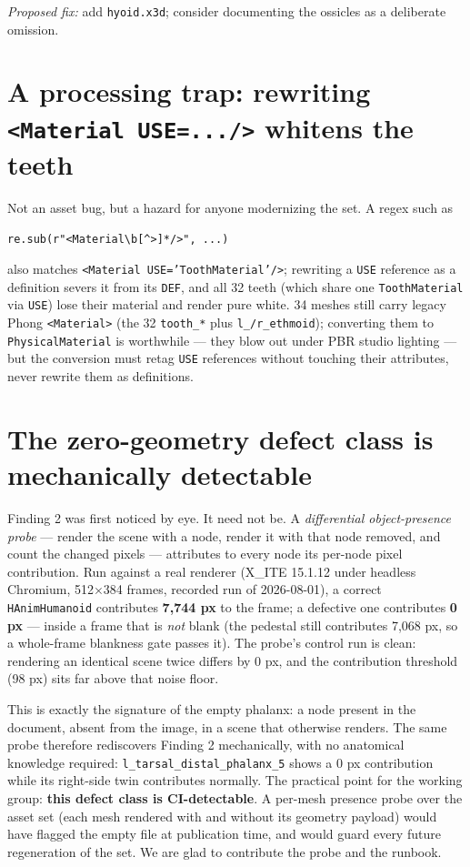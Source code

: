 \documentclass[10pt]{article}
\newcommand{\code}[1]{\texttt{#1}}
\begin{document}
\emph{Proposed fix:} add \code{hyoid.x3d}; consider documenting the ossicles as a
deliberate omission.

\section{A processing trap: rewriting \code{<Material USE=.../>} whitens the teeth}
Not an asset bug, but a hazard for anyone modernizing the set. A regex such as
\begin{center}
\code{re.sub(r"<Material\textbackslash b[\textasciicircum>]*/>", ...)}
\end{center}
also matches
\code{<Material USE='ToothMaterial'/>}; rewriting a \code{USE} reference as a definition
severs it from its \code{DEF}, and all 32 teeth (which share one \code{ToothMaterial} via
\code{USE}) lose their material and render pure white. 34 meshes still carry legacy Phong
\code{<Material>} (the 32 \code{tooth\_*} plus \code{l\_/r\_ethmoid}); converting them to
\code{PhysicalMaterial} is worthwhile --- they blow out under PBR studio lighting --- but
the conversion must retag \code{USE} references without touching their attributes, never
rewrite them as definitions.

\section{The zero-geometry defect class is mechanically detectable}
Finding 2 was first noticed by eye. It need not be. A \emph{differential object-presence
probe} --- render the scene with a node, render it with that node removed, and count the
changed pixels --- attributes to every node its per-node pixel contribution. Run against a
real renderer (X\_ITE 15.1.12 under headless Chromium, 512$\times$384 frames, recorded run
of 2026-08-01), a correct \code{HAnimHumanoid} contributes \textbf{7{,}744 px} to the frame;
a defective one contributes \textbf{0 px} --- inside a frame that is \emph{not} blank
(the pedestal still contributes 7{,}068 px, so a whole-frame blankness gate passes it).
The probe's control run is clean: rendering an identical scene twice differs by 0 px, and
the contribution threshold (98 px) sits far above that noise floor.

This is exactly the signature of the empty phalanx: a node present in the document,
absent from the image, in a scene that otherwise renders. The same probe therefore
rediscovers Finding 2 mechanically, with no anatomical knowledge required:
\code{l\_tarsal\_distal\_phalanx\_5} shows a 0 px contribution while its right-side
twin contributes normally. The practical point for the working group: \textbf{this defect class
is CI-detectable}. A per-mesh presence probe over the asset set (each mesh rendered with
and without its geometry payload) would have flagged the empty file at publication time,
and would guard every future regeneration of the set. We are glad to contribute the probe
and the runbook.
\end{document}
